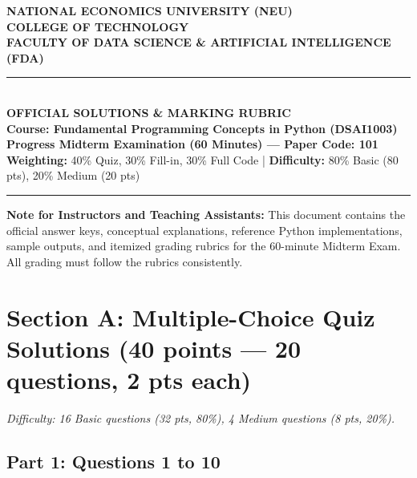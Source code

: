 \documentclass[11pt,a4paper]{article}
\begin{document}
\begin{center}
  {\Large\textbf{NATIONAL ECONOMICS UNIVERSITY (NEU)}}\\[0.08cm]
  {\large\textbf{COLLEGE OF TECHNOLOGY}}\\[0.05cm]
  {\large\textbf{FACULTY OF DATA SCIENCE \& ARTIFICIAL INTELLIGENCE (FDA)}}\\[0.15cm]
  \rule{\textwidth}{1.2pt}\\[0.15cm]
  {\LARGE\bfseries\color{primaryblue}OFFICIAL SOLUTIONS \& MARKING RUBRIC}\\[0.08cm]
  {\large\textbf{Course: Fundamental Programming Concepts in Python (DSAI1003)}}\\[0.08cm]
  {\normalsize\textbf{Progress Midterm Examination (60 Minutes) --- Paper Code: 101}}\\[0.06cm]
  {\footnotesize\textbf{Weighting:} 40\% Quiz, 30\% Fill-in, 30\% Full Code \quad | \quad \textbf{Difficulty:} 80\% Basic (80 pts), 20\% Medium (20 pts)}\\[0.10cm]
  \rule{\textwidth}{0.6pt}
\end{center}

\vspace{0.08cm}

\begin{tcolorbox}[colback=green!8, colframe=correctgreen, arc=1.2mm, boxrule=0.6pt, left=2.0mm, right=2.0mm, top=1.0mm, bottom=1.0mm]
\small
\textbf{Note for Instructors and Teaching Assistants:}
This document contains the official answer keys, conceptual explanations, reference Python implementations, sample outputs, and itemized grading rubrics for the 60-minute Midterm Exam. All grading must follow the rubrics consistently.
\end{tcolorbox}

\vspace{0.08cm}

\section*{Section A: Multiple-Choice Quiz Solutions (40 points --- 20 questions, 2 pts each)}
\textit{Difficulty: 16 Basic questions (32 pts, 80\%), 4 Medium questions (8 pts, 20\%).}

\subsection*{Part 1: Questions 1 to 10}
\end{document}
